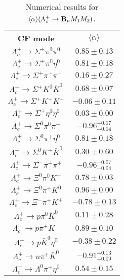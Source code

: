\begin{table}
	\caption{Numerical results for 
		$\langle \alpha \rangle(\Lambda_{c}^{+} \to {\bf B}_nM_1M_2)$.}\label{apre_Lcp}
	{\scriptsize
		\begin{tabular}{|c|c|}
			\hline
			CF mode& $\langle \alpha \rangle$ \\
			\hline
			$ \Lambda_{c}^{+} \to\Sigma^{+} \pi^{0} \pi^{0} $ & $       0.85 \pm       0.13 $ \\
			$ \Lambda_{c}^{+} \to\Sigma^{+} \pi^{0} \eta^{0} $ & $       0.81 \pm       0.18 $ \\
			$\Lambda_{c}^{+} \to\Sigma^{+} \pi^{+} \pi^{-} $ & $       0.16 \pm       0.27 $ \\
			$\Lambda_{c}^{+} \to \Sigma^{+} K^{0} \bar{K}^{0} $ & $       0.68 \pm       0.07 $ \\
			$\Lambda_{c}^{+} \to \Sigma^{+} K^{+} K^{-} $ & $      -0.06 \pm       0.11 $ \\
			$ \Lambda_{c}^{+} \to\Sigma^{+} \eta^{0} \eta^{0} $ & $       0.03 \pm       0.00 $ \\
			$ \Lambda_{c}^{+} \to\Sigma^{0} \pi^{0} \pi^{+} $ & $      -0.96 ^{+0.07}_{-0.04} $ \\
			$ \Lambda_{c}^{+} \to\Sigma^{0} \pi^{+} \eta^{0} $ & $       0.81 \pm       0.18 $ \\
			$\Lambda_{c}^{+} \to \Sigma^{0} K^{+} \bar{K}^{0} $ & $       0.30 \pm       0.60 $ \\
			$\Lambda_{c}^{+} \to\Sigma^{-} \pi^{+} \pi^{+} $ & $      -0.96 ^{+0.07 }_{-0.04}$ \\
			$ \Lambda_{c}^{+} \to\Xi^{0} \pi^{0} K^{+} $ & $       0.78 \pm       0.03 $ \\
			$\Lambda_{c}^{+} \to \Xi^{0} \pi^{+} K^{0} $ & $       0.96 \pm       0.00 $ \\
			$\Lambda_{c}^{+} \to \Xi^{-} \pi^{+} K^{+} $ & $      -0.78 \pm       0.13 $ \\
			$ \Lambda_{c}^{+} \to p \pi^{0} \bar{K}^{0} $ & $       0.11 \pm       0.28 $ \\
			$ \Lambda_{c}^{+} \to p \pi^{+} K^{-} $ & $       0.89 \pm       0.10 $ \\
			$\Lambda_{c}^{+} \to p \bar{K}^{0} \eta^{0} $ & $      -0.38 \pm       0.22 $ \\
			$\Lambda_{c}^{+} \to n \pi^{+} \bar{K}^{0} $ & $      -0.91 ^{+0.13}_{-0.09} $ \\
			$ \Lambda_{c}^{+} \to\Lambda^{0} \pi^{+} \eta^{0} $ & $       0.54 \pm       0.15 $ \\

\end{tabular}}
\end{table}
